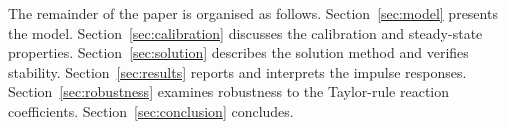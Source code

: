 The remainder of the paper is organised as follows.
Section~\ref{sec:model} presents the model.
Section~\ref{sec:calibration} discusses the calibration and steady-state
properties.
Section~\ref{sec:solution} describes the solution method and verifies
stability.
Section~\ref{sec:results} reports and interprets the impulse responses.
Section~\ref{sec:robustness} examines robustness to the Taylor-rule
reaction coefficients.
Section~\ref{sec:conclusion} concludes.

